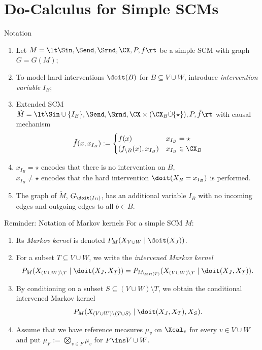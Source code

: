 \part{Do-Calculus for Simple SCMs}
\frame{\partpage}

\begin{frame}{Notation}
  \begin{enumerate}
    \item Let $M = \lt \Sin, \Send, \Srnd, \CX, P, f \rt$ be a simple SCM with graph $G = G(M)$;
    \item To model hard interventions $\doit(B)$ for $B \subseteq V \cup W$, introduce \emph{intervention variable} $I_B$;
    \item Extended SCM $\tilde{M} = \lt \Sin \cup \{I_B\}, \Send, \Srnd, \CX \times (\CX_B \dot\cup \{\star\}), P, \tilde{f} \rt$ with causal mechanism
$$\tilde{f}(x,x_{I_B}) := \begin{cases}
  f(x) & x_{I_B} = \star \\
  (f_{\setminus B}(x), x_{I_B}) & x_{I_B} \in \CX_B
\end{cases}$$
    \item $x_{I_B} = \star$ encodes that there is no intervention on $B$,\\
$x_{I_B} \ne \star$ encodes that the hard intervention $\doit(X_B = x_{I_B})$ is performed.
\item The graph of $\tilde{M}$, $G_{\doit(I_B)}$, has an additional variable $I_B$ with no incoming edges
  and outgoing edges to all $b \in B$.
  \end{enumerate}
\end{frame}

\begin{frame}{Reminder: Notation of Markov kernels}
  For a simple SCM $M$:
  \begin{enumerate}
    \item Its \emph{Markov kernel} is denoted $P_{M}(X_{V\cup W} \mid \doit(X_J))$.
    \item For a subset $T \subseteq V \cup W$, we write the \emph{intervened Markov kernel}
$$P_{M}(X_{(V\cup W)\setminus T} \mid \doit(X_J,X_T)) = P_{M_{\doit(T)}}(X_{(V\cup W)\setminus T} \mid \doit(X_J,X_T)).$$
\item By conditioning on a subset $S \subseteq (V \cup W) \setminus T$, we obtain the conditional intervened Markov kernel
$$P_{M}(X_{(V\cup W)\setminus (T \cup S)} \mid \doit(X_J,X_T), X_S).$$
    \item Assume that we have reference measures $\mu_v$ on $\Xcal_v$ for every $v \in V \cup W$
  and put $\mu_F := \bigotimes_{v \in F} \mu_v$ for $F \ins V \cup W$.
  \end{enumerate}
\end{frame}

